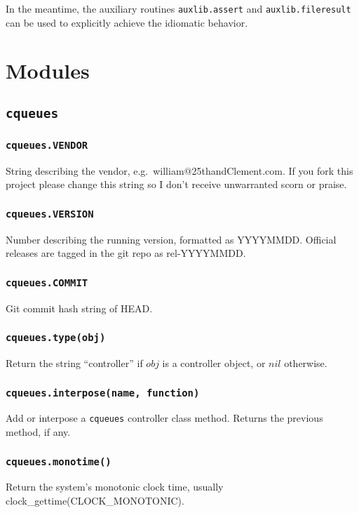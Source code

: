 \documentclass[11pt, oneside]{memoir}
\newcommand{\cqueues}[0]{\texttt{cqueues} }
\newcommand{\routine}[1]{\texttt{#1} }
\newcommand{\fn}[1]{\texttt{#1} }
\newcounter{toccols}
\newenvironment{Module}[1]{
	\subsection{\texttt{#1}}
	\addtocontents{toc}{
		\protect\begin{multicols}{\value{toccols}}
	}
}{
	\addtocontents{toc}{\protect\end{multicols}}
}
\begin{document}
In the meantime, the auxiliary routines \fn{auxlib.assert} and \fn{auxlib.fileresult} can be used to explicitly achieve the idiomatic behavior.

\section{Modules}

\begin{Module}{\cqueues}

\subsubsection{\routine{cqueues.VENDOR}}
String describing the vendor, e.g.\ william@25thandClement.com. If you fork this project please change this string so I don't receive unwarranted scorn or praise.

\subsubsection{\routine{cqueues.VERSION}}
Number describing the running version, formatted as YYYYMMDD. Official releases are tagged in the git repo as rel-YYYYMMDD.

\subsubsection{\routine{cqueues.COMMIT}}
Git commit hash string of HEAD.

\subsubsection[\routine{cqueues.type}]{\routine{cqueues.type(obj)}}
Return the string ``controller'' if $obj$ is a controller object, or $nil$ otherwise.

\subsubsection[\routine{cqueues.interpose}]{\routine{cqueues.interpose(name, function)}}
Add or interpose a \cqueues controller class method. Returns the previous method, if any.

\subsubsection[\routine{cqueues.monotime}]{\routine{cqueues.monotime()}}
Return the system's monotonic clock time, usually clock\_gettime(CLOCK\_MONOTONIC).


\end{Module}
\end{document}
